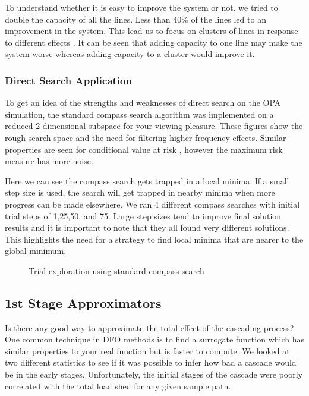  
To understand whether it is easy to improve the system or not, we tried to double the capacity of all the lines.  Less than 40\% of the lines led to an improvement in the system.
\endnote{}
This lead us to focus on clusters of lines in response to different effects \endnote{}.  It can be seen that adding capacity to one line may make the system worse whereas adding capacity to a cluster would improve it.  


\subsubsection{Direct Search Application}

To get an idea of the strengths and weaknesses of direct search on the OPA simulation, the standard compass search algorithm was implemented on a reduced 2 dimensional subspace for your viewing pleasure.  These figures show the rough search space and the need for filtering higher frequency effects.  Similar properties are seen for conditional value at risk \endnote{}, however the maximum risk measure has more noise.

Here we can see the compass search gets trapped in a local minima.  If a small step size is used, the search will get trapped in nearby minima when more progress can be made elsewhere.   We ran 4 different compass searches with initial trial steps of 1,25,50, and 75.  Large step sizes tend to improve final solution results and it is important to note that they all found very different solutions. This highlights the need for a strategy to find local minima that are nearer to the global minimum. \endnote{}
\begin{figure}
\centering

\caption{Trial exploration using standard compass search}
\end{figure}



\subsection{1st Stage Approximators}
Is there any good way to approximate the total effect of the cascading process?  One common technique in DFO methods is to find a surrogate function which has similar properties to your real function but is faster to compute.  We looked at two different statistics to see if it was possible to infer how bad a cascade would be in the early stages.  Unfortunately, the initial stages of the cascade were poorly correlated with the total load shed for any given sample path.

